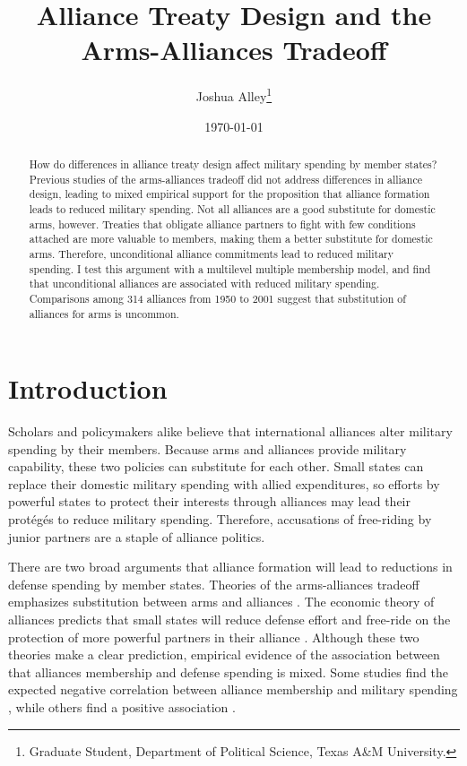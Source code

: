 \documentclass[12pt]{article}
\title{\textbf{Alliance Treaty Design and the Arms-Alliances Tradeoff}}
\author{Joshua Alley\footnote{Graduate Student,
Department of Political Science, Texas A\&M University.}}
\date{{\normalsize \today}}
\begin{document}
\maketitle 

\newpage 

\doublespace 

\begin{abstract}

How do differences in alliance treaty design affect military spending by member states? Previous studies of the arms-alliances tradeoff did not address differences in alliance design, leading to mixed empirical support for the proposition that alliance formation leads to reduced military spending. Not all alliances are a good substitute for domestic arms, however. Treaties that obligate alliance partners to fight with few conditions attached are more valuable to members, making them a better substitute for domestic arms. Therefore, unconditional alliance commitments lead to reduced military spending. I test this argument with a multilevel multiple membership model, and find that unconditional alliances are associated with reduced military spending. Comparisons among 314 alliances from 1950 to 2001 suggest that substitution of alliances for arms is uncommon. 

\end{abstract}



\section*{Introduction}

Scholars and policymakers alike believe that international alliances alter military spending by their members. Because arms and alliances provide military capability, these two policies can substitute for each other. Small states can replace their domestic military spending with allied expenditures, so efforts by powerful states to protect their interests through alliances may lead their prot\'eg\'es to reduce military spending. Therefore, accusations of free-riding by junior partners are a staple of alliance politics. 

There are two broad arguments that alliance formation will lead to reductions in defense spending by member states. Theories of the arms-alliances tradeoff emphasizes substitution between arms and alliances \citep{Morrow1993, Sorokin1994}. The economic theory of alliances predicts that small states will reduce defense effort and free-ride on the protection of more powerful partners in their alliance \citep{OlsonZeckhauser1966, SandlerHartley2001}. Although these two theories make a clear prediction, empirical evidence of the association between that alliances membership and defense spending is mixed. Some studies find the expected negative correlation between alliance membership and military spending \citep{Conybeare1992, Sorokin1994, DigiuseppePoast2016}, while others find a positive association \citep{Diehl1994, MorganPalmer2006, QuirozFlores2011}.   
\end{document}
